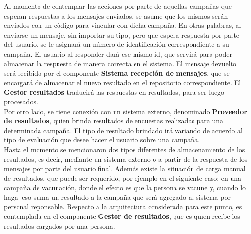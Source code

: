 \documentclass[a4paper, 11pt]{article}
\begin{document}
Al momento de contemplar las acciones por parte de aquellas campa\~nas que esperan respuestas a los mensajes enviados, se asume que los mismos ser\'an enviados con un código para vincular con dicha campa\~na. En otras palabras, al enviarse un mensaje, sin importar su tipo, pero que espera respuesta por parte del usuario, se le asignará un número de identificación correspondiente a su campa\~na. El usuario al responder dará ese mismo id, que servirá para poder almacenar la respuesta de manera correcta en el sistema. El mensaje devuelto será recibido por el componente \textbf{Sistema recepción de mensajes}, que se encargará de almacenar el nuevo resultado en el repositorio correspondiente. El \textbf{Gestor resultados} traducirá las respuestas en resultados, para ser luego procesados. \\

Por otro lado, se tiene conexión con un sistema externo, denominado \textbf{Proveedor de resultados}, quien brinda resultados de encuestas realizadas para una determinada campa\~na. El tipo de resultado brindado irá variando de acuerdo al tipo de evaluación que desee hacer el usuario sobre una campa\~na. \\

Hasta el momento se mencionaron dos tipos diferentes de almacenamiento de los resultados, es decir, mediante un sistema externo o a partir de la respuesta de los mensajes por parte del usuario final. 
Además existe la situación de carga manual de resultados, que puede ser requerido, por ejemplo en el siguiente caso: en una campa\~na de vacunación, donde el efecto es que la persona se vacune y, cuando lo haga, eso suma un resultado a la campa\~na que será agregado al sistema por personal reponsable. 
Respecto a la arquitectura considerada para este punto, es contemplada en el componente \textbf{Gestor de resultados}, que es quien recibe los resultados cargados por una persona.\\

\end{document}
